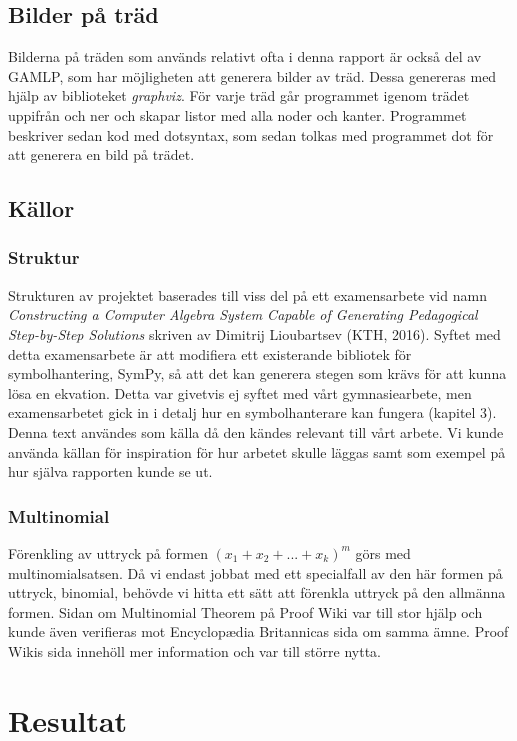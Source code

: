 \documentclass[12pt,a4paper]{article}
\begin{document}
\subsection{Bilder på träd}
Bilderna på träden som används relativt ofta i denna rapport är också del av GAMLP, som har möjligheten att generera bilder av träd. Dessa genereras med hjälp av biblioteket \textit{graphviz}. För varje träd går programmet igenom trädet uppifrån och ner och skapar listor med alla noder och kanter. Programmet beskriver sedan kod med dotsyntax, som sedan tolkas med programmet dot för att generera en bild på trädet.

\subsection{Källor}
\subsubsection{Struktur}
Strukturen av projektet baserades till viss del på ett examensarbete vid namn \textit{Constructing a Computer Algebra System Capable of Generating Pedagogical Step-by-Step Solutions} skriven av Dimitrij Lioubartsev (KTH, 2016). Syftet med detta examensarbete är att modifiera ett existerande bibliotek för symbolhantering, SymPy, så att det kan generera stegen som krävs för att kunna lösa en ekvation. Detta var givetvis ej syftet med vårt gymnasiearbete, men examensarbetet gick in i detalj hur en symbolhanterare kan fungera (kapitel 3). Denna text användes som källa då den kändes relevant till vårt arbete. Vi kunde använda källan för inspiration för hur arbetet skulle läggas samt som exempel på hur själva rapporten kunde se ut.

\subsubsection{Multinomial}
Förenkling av uttryck på formen \((x_{1}+x_{2}+...+x_{k})^{m}\) görs med multinomialsatsen. Då vi endast jobbat med ett specialfall av den här formen på uttryck, binomial, behövde vi hitta ett sätt att förenkla uttryck på den allmänna formen. Sidan om Multinomial Theorem på Proof Wiki var till stor hjälp och kunde även verifieras mot Encyclopædia Britannicas sida om samma ämne. Proof Wikis sida innehöll mer information och var till större nytta.

\section{Resultat}
\end{document}
